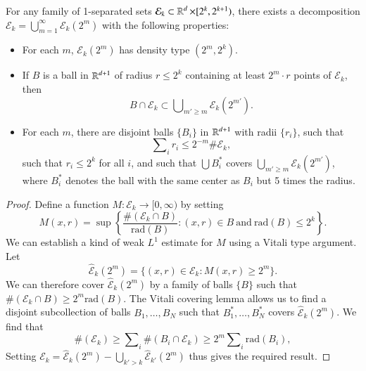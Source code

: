 \begin{theorem} \label{DecompositionTheorem}
    For any family of 1-separated sets $\mathcal{E}_k \subset \operatorname{\mathbb{R}}^d \times [2^k,2^{k+1})$, there exists a decomposition $\mathcal{E}_k = \bigcup_{m = 1}^\infty \mathcal{E}_k(2^m)$ with the following properties:
    \begin{itemize}
        \item For each $m$, $\mathcal{E}_k(2^m)$ has density type $(2^m,2^k)$.

        \item If $B$ is a ball in $\operatorname{\mathbb{R}}^{d+1}$ of radius $r \leq 2^k$ containing at least $2^m \cdot r$ points of $\mathcal{E}_k$, then
        \[ B \cap \mathcal{E}_k \subset \bigcup\nolimits_{m' \geq m} \mathcal{E}_k(2^{m'}). \]

        \item For each $m$, there are disjoint balls $\{ B_i \}$ in $\operatorname{\mathbb{R}}^{d+1}$ with radii $\{ r_i \}$, such that
        \[ \sum\nolimits_i r_i \leq 2^{-m} \# \mathcal{E}_k, \]
        such that $r_i \leq 2^k$ for all $i$, and such that $\bigcup B_i^*$ covers $\bigcup_{m' \geq m} \mathcal{E}_k(2^{m'})$, where $B_i^*$ denotes the ball with the same center as $B_i$ but 5 times the radius.
    \end{itemize}
\end{theorem}
\begin{proof}
    Define a function $M: \mathcal{E}_k \to [0,\infty)$ by setting
    \[ M(x,r) = \sup \left\{ \frac{\#(\mathcal{E}_k \cap B)}{\text{rad}(B)} : (x,r) \in B\ \text{and}\ \text{rad}(B) \leq 2^k \right\}. \]
    We can establish a kind of weak $L^1$ estimate for $M$ using a Vitali type argument. Let
    \[ \widehat{\mathcal{E}}_k(2^m) = \{ (x,r) \in \mathcal{E}_k : M(x,r) \geq 2^m \}. \]
    We can therefore cover $\widehat{\mathcal{E}}_k(2^m)$ by a family of balls $\{ B \}$ such that $\#(\mathcal{E}_k \cap B) \geq 2^m \text{rad}(B)$. The Vitali covering lemma allows us to find a disjoint subcollection of balls $B_1,\dots,B_N$ such that $B_1^* ,\dots, B_N^*$ covers $\widehat{\mathcal{E}}_k(2^m)$. We find that
    \begin{equation}
      \#(\mathcal{E}_k) \geq \sum\nolimits_i \#(B_i \cap \mathcal{E}_k) \geq 2^m \sum\nolimits_i \text{rad}(B_i),
    \end{equation}
    Setting $\mathcal{E}_k = \widehat{\mathcal{E}}_k(2^m) - \bigcup_{k' > k} \widehat{\mathcal{E}}_{k'}(2^m)$ thus gives the required result.
\end{proof}

